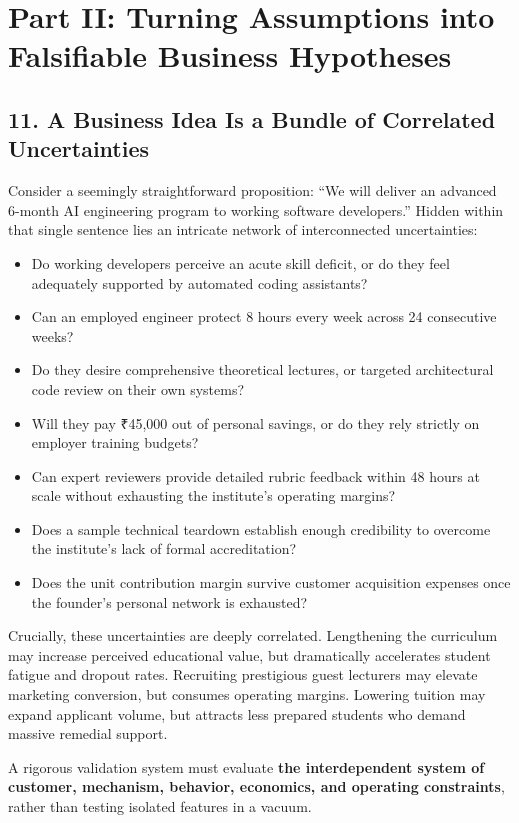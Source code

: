 \section*{Part II: Turning Assumptions into Falsifiable Business Hypotheses}

\subsection*{11. A Business Idea Is a Bundle of Correlated Uncertainties}

Consider a seemingly straightforward proposition: ``We will deliver an advanced 6-month AI engineering program to working software developers.'' Hidden within that single sentence lies an intricate network of interconnected uncertainties:
\begin{itemize}
    \item Do working developers perceive an acute skill deficit, or do they feel adequately supported by automated coding assistants?
    \item Can an employed engineer protect 8 hours every week across 24 consecutive weeks?
    \item Do they desire comprehensive theoretical lectures, or targeted architectural code review on their own systems?
    \item Will they pay ₹45,000 out of personal savings, or do they rely strictly on employer training budgets?
    \item Can expert reviewers provide detailed rubric feedback within 48 hours at scale without exhausting the institute's operating margins?
    \item Does a sample technical teardown establish enough credibility to overcome the institute's lack of formal accreditation?
    \item Does the unit contribution margin survive customer acquisition expenses once the founder's personal network is exhausted?
\end{itemize}

Crucially, these uncertainties are deeply correlated. Lengthening the curriculum may increase perceived educational value, but dramatically accelerates student fatigue and dropout rates. Recruiting prestigious guest lecturers may elevate marketing conversion, but consumes operating margins. Lowering tuition may expand applicant volume, but attracts less prepared students who demand massive remedial support.

A rigorous validation system must evaluate \textbf{the interdependent system of customer, mechanism, behavior, economics, and operating constraints}, rather than testing isolated features in a vacuum.

